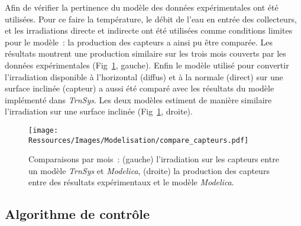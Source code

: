 Afin de vérifier la pertinence du modèle des données expérimentales ont été utilisées.
Pour ce faire la température, le débit de l’eau en entrée des collecteurs, et les
irradiations directe et indirecte ont été utilisées comme conditions limites pour le
modèle~: la production des capteurs a ainsi pu être comparée. Les résultats montrent une
production similaire sur les trois mois couverts par les données expérimentales
(Fig~\ref{fig:compare_capteurs}, gauche). Enfin le modèle utilisé pour convertir
l’irradiation disponible à l’horizontal (diffus) et à la normale (direct) sur une surface
inclinée (capteur) a aussi été comparé avec les résultats du modèle implémenté dans
\emph{TrnSys}. Les deux modèles estiment de manière similaire l’irradiation sur une
surface inclinée (Fig~\ref{fig:compare_capteurs}, droite).

\begin{figure}
    \begin{center}
        \texttt{[image: Ressources/Images/Modelisation/compare\_capteurs.pdf]}
    \end{center}
    \caption{Comparaisons par mois~: (gauche) l’irradiation sur les capteurs entre un modèle
             \emph{TrnSys} et \emph{Modelica}, (droite) la production des capteurs entre des résultats
             expérimentaux et le modèle \emph{Modelica}.
             \label{fig:compare_capteurs}}
\end{figure}


\subsection{Algorithme de contrôle} %
\label{sub:algorithme_de_controle}
